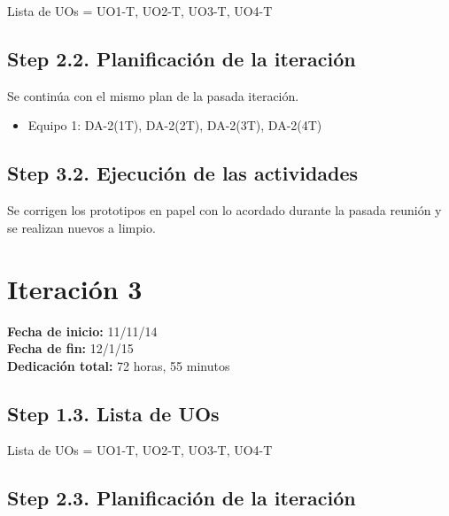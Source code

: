 Lista de UOs = {UO1-T, UO2-T, UO3-T, UO4-T}

\subsection{Step 2.2. Planificación de la iteración}
\label{it2:2.2}

Se continúa con el mismo plan de la pasada iteración.

\begin{itemize}
\item Equipo 1: DA-2(1T), DA-2(2T), DA-2(3T), DA-2(4T)
\end{itemize}

\subsection{Step 3.2. Ejecución de las actividades}
\label{it2:3.2}

Se corrigen los prototipos en papel con lo acordado durante la pasada reunión y se realizan nuevos a limpio.\\


\section{Iteración 3}
\label{it3}

\begin{flushleft}
\textbf{Fecha de inicio:} 11/11/14\\
\textbf{Fecha de fin:} 12/1/15\\
\textbf{Dedicación total:} 72 horas, 55 minutos\\
\end{flushleft}

\subsection{Step 1.3. Lista de UOs}
\label{it3:1.3}

Lista de UOs = {UO1-T, UO2-T, UO3-T, UO4-T}

\subsection{Step 2.3. Planificación de la iteración}
\label{it2:2.3}

